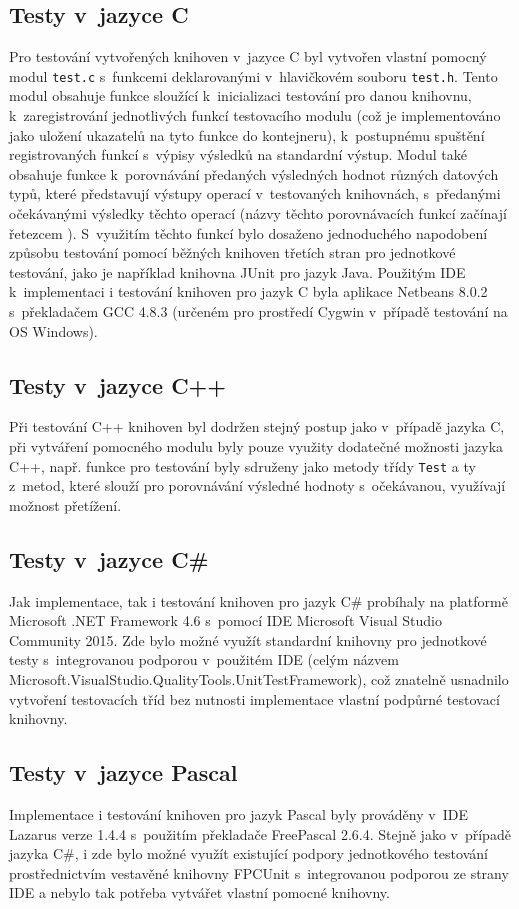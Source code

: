 \documentclass[czech,BP]{thesiskiv}
\begin{document}
\subsection{Testy v~jazyce C}
Pro testování vytvořených knihoven v~jazyce C byl vytvořen vlastní pomocný modul \texttt{test.c} s~funkcemi deklarovanými v~hlavičkovém souboru \texttt{test.h}. Tento modul obsahuje funkce sloužící k~inicializaci testování pro danou knihovnu, k~zaregistrování jednotlivých funkcí testovacího modulu (což je implementováno jako uložení ukazatelů na tyto funkce do kontejneru), k~postupnému spuštění registrovaných funkcí s~výpisy výsledků na standardní výstup. Modul také obsahuje funkce k~porovnávání předaných výsledných hodnot různých datových typů, které představují výstupy operací v~testovaných knihovnách, s~předanými očekávanými výsledky těchto operací (názvy těchto porovnávacích funkcí začínají řetezcem ). S~využitím těchto funkcí bylo dosaženo jednoduchého napodobení způsobu testování pomocí běžných knihoven třetích stran pro jednotkové testování, jako je například knihovna JUnit pro jazyk Java. Použitým IDE k~implementaci i testování knihoven pro jazyk C byla aplikace Netbeans 8.0.2 s~překladačem GCC 4.8.3 (určeném pro prostředí Cygwin v~případě testování na OS Windows).

\subsection{Testy v~jazyce C++}
Při testování C++ knihoven byl dodržen stejný postup jako v~případě jazyka C, při vytváření pomocného modulu byly pouze využity dodatečné možnosti jazyka C++, např. funkce pro testování byly sdruženy jako metody třídy \texttt{Test} a ty z~metod, které slouží pro porovnávání výsledné hodnoty s~očekávanou, využívají možnost přetížení.

\subsection{Testy v~jazyce C\#}
Jak implementace, tak i testování knihoven pro jazyk C\# probíhaly na platformě Microsoft .NET Framework 4.6 s~pomocí IDE Microsoft Visual Studio Community 2015. Zde bylo možné využít standardní knihovny pro jednotkové testy s~integrovanou podporou v~použitém IDE (celým názvem Microsoft.VisualStudio.QualityTools.UnitTestFramework), což znatelně usnadnilo vytvoření testovacích tříd bez nutnosti implementace vlastní podpůrné testovací knihovny.

\subsection{Testy v~jazyce Pascal}
Implementace i testování knihoven pro jazyk Pascal byly prováděny v~IDE Lazarus verze 1.4.4 s~použitím překladače FreePascal 2.6.4. Stejně jako v~případě jazyka C\#, i zde bylo možné využít existující podpory jednotkového testování prostřednictvím vestavěné knihovny FPCUnit s~integrovanou podporou ze strany IDE a nebylo tak potřeba vytvářet vlastní pomocné knihovny.
\end{document}
